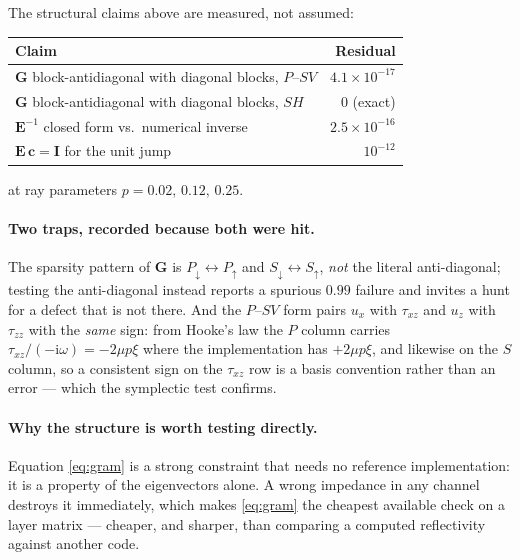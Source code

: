 \documentclass[11pt,a4paper]{article}
\newcommand{\ii}{\mathrm{i}}
\newcommand{\bI}{\mathbf{I}}
\newcommand{\bE}{\mathbf{E}}
\begin{document}
\medskip
\noindent The structural claims above are measured, not assumed:

\begin{center}
\begin{tabular}{lr}
\toprule
Claim & Residual \\
\midrule
$\mathbf{G}$ block-antidiagonal with diagonal blocks, $P$--$SV$ & $4.1\times10^{-17}$\\
$\mathbf{G}$ block-antidiagonal with diagonal blocks, $SH$ & $0$ (exact)\\
$\bE^{-1}$ closed form vs.\ numerical inverse & $2.5\times10^{-16}$\\
$\bE\,\mathbf{c}=\bI$ for the unit jump & $10^{-12}$\\
\bottomrule
\end{tabular}
\end{center}

\noindent at ray parameters $p=0.02,\,0.12,\,0.25$.

\paragraph{Two traps, recorded because both were hit.} The sparsity pattern of
$\mathbf{G}$ is $P_{\downarrow}\!\leftrightarrow\!P_{\uparrow}$ and
$S_{\downarrow}\!\leftrightarrow\!S_{\uparrow}$, \emph{not} the literal
anti-diagonal; testing the anti-diagonal instead reports a spurious $0.99$
failure and invites a hunt for a defect that is not there. And the $P$--$SV$
form pairs $u_x$ with $\tau_{xz}$ and $u_z$ with $\tau_{zz}$ with the
\emph{same} sign: from Hooke's law the $P$ column carries
$\tau_{xz}/(-\ii\omega)=-2\mu p\xi$ where the implementation has $+2\mu p\xi$,
and likewise on the $S$ column, so a consistent sign on the $\tau_{xz}$ row is a
basis convention rather than an error --- which the symplectic test confirms.

\paragraph{Why the structure is worth testing directly.} Equation
\eqref{eq:gram} is a strong constraint that needs no reference implementation:
it is a property of the eigenvectors alone. A wrong impedance in any channel
destroys it immediately, which makes \eqref{eq:gram} the cheapest available
check on a layer matrix --- cheaper, and sharper, than comparing a computed
reflectivity against another code.

\end{document}
